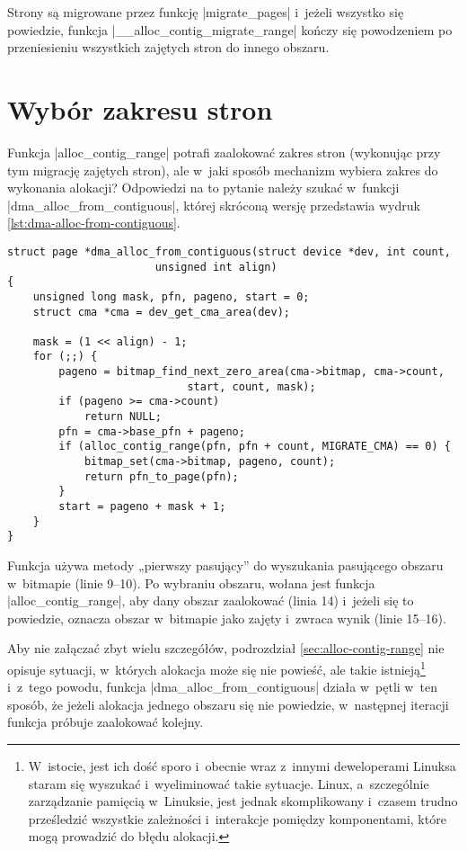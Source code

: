 Strony są migrowane przez funkcję \code|migrate_pages| i~jeżeli
wszystko się powiedzie, funkcja \code|__alloc_contig_migrate_range|
kończy się powodzeniem po przeniesieniu wszystkich zajętych stron do
innego obszaru.


\section{Wybór zakresu stron}\label{sec:alloc-from-contig}

Funkcja \code|alloc_contig_range| potrafi zaalokować zakres stron
(wykonując przy tym migrację zajętych stron), ale w~jaki sposób
mechanizm  wybiera zakres do wykonania alokacji?  Odpowiedzi
na to pytanie należy szukać w~funkcji
\code|dma_alloc_from_contiguous|, której skróconą wersję przedstawia
wydruk \ref{lst:dma-alloc-from-contiguous}.

\begin{lstlisting}[float=tb,caption={Skrócony wydruk funkcji
    \code|dma_alloc_from_contiguous| z Linuksa
    3.5.},label=lst:dma-alloc-from-contiguous]
struct page *dma_alloc_from_contiguous(struct device *dev, int count,
				       unsigned int align)
{
	unsigned long mask, pfn, pageno, start = 0;
	struct cma *cma = dev_get_cma_area(dev);

	mask = (1 << align) - 1;
	for (;;) {
		pageno = bitmap_find_next_zero_area(cma->bitmap, cma->count,
						    start, count, mask);
		if (pageno >= cma->count)
			return NULL;
		pfn = cma->base_pfn + pageno;
		if (alloc_contig_range(pfn, pfn + count, MIGRATE_CMA) == 0) {
			bitmap_set(cma->bitmap, pageno, count);
			return pfn_to_page(pfn);
		}
		start = pageno + mask + 1;
	}
}
\end{lstlisting}

Funkcja używa metody „pierwszy pasujący” do wyszukania pasującego
obszaru w~bitmapie (linie 9--10).  Po wybraniu obszaru, wołana jest
funkcja \code|alloc_contig_range|, aby dany obszar zaalokować
(linia 14) i~jeżeli się to powiedzie, oznacza obszar w~bitmapie jako
zajęty i~zwraca wynik (linie 15--16).

Aby nie załączać zbyt wielu szczegółów, podrozdział
\ref{sec:alloc-contig-range} nie opisuje sytuacji, w~których alokacja
może się nie powieść, ale takie istnieją\footnote{W~istocie, jest ich
  dość sporo i~obecnie wraz z~innymi deweloperami Linuksa staram się
  wyszukać i~wyeliminować takie sytuacje.  Linux, a~szczególnie
  zarządzanie pamięcią w~Linuksie, jest jednak skomplikowany i~czasem
  trudno prześledzić wszystkie zależności i~interakcje pomiędzy
  komponentami, które mogą prowadzić do błędu alokacji.} i~z~tego
powodu, funkcja \code|dma_alloc_from_contiguous| działa w~pętli w~ten
sposób, że jeżeli alokacja jednego obszaru się nie powiedzie,
w~następnej iteracji funkcja próbuje zaalokować kolejny.

